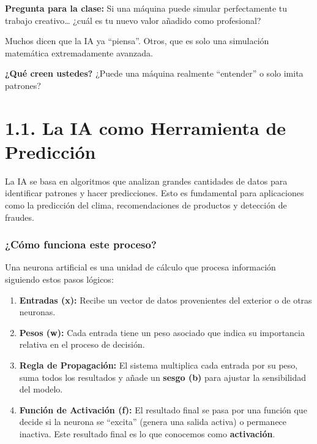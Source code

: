 \documentclass[
  spanish,
  letterpaper,
  DIV=11,
  numbers=noendperiod,
  oneside]{scrreprt}
\providecommand{\tightlist}{%
  \setlength{\itemsep}{0pt}\setlength{\parskip}{0pt}}
\begin{document}
\textbf{Pregunta para la clase:} Si una máquina puede simular
perfectamente tu trabajo creativo\ldots{} ¿cuál es tu nuevo valor
añadido como profesional?

\begin{tcolorbox}[enhanced jigsaw, arc=.35mm, bottomrule=.15mm, bottomtitle=1mm, breakable, colback=white, colbacktitle=quarto-callout-important-color!10!white, colframe=quarto-callout-important-color-frame, coltitle=black, left=2mm, leftrule=.75mm, opacityback=0, opacitybacktitle=0.6, rightrule=.15mm, title=\textcolor{quarto-callout-important-color}{\faExclamation}\hspace{0.5em}{🧠 Gran Debate: ¿La IA piensa o solo calcula?}, titlerule=0mm, toprule=.15mm, toptitle=1mm]

Muchos dicen que la IA ya ``piensa''. Otros, que es solo una simulación
matemática extremadamente avanzada.

\textbf{¿Qué creen ustedes?} ¿Puede una máquina realmente ``entender'' o
solo imita patrones?

\end{tcolorbox}

\section{1.1. La IA como Herramienta de
Predicción}\label{la-ia-como-herramienta-de-predicciuxf3n}

La IA se basa en algoritmos que analizan grandes cantidades de datos
para identificar patrones y hacer predicciones. Esto es fundamental para
aplicaciones como la predicción del clima, recomendaciones de productos
y detección de fraudes.

\subsubsection{¿Cómo funciona este
proceso?}\label{cuxf3mo-funciona-este-proceso}

Una neurona artificial es una unidad de cálculo que procesa información
siguiendo estos pasos lógicos:

\begin{enumerate}
\def\labelenumi{\arabic{enumi}.}
\tightlist
\item
  \textbf{Entradas (x):} Recibe un vector de datos provenientes del
  exterior o de otras neuronas.
\item
  \textbf{Pesos (w):} Cada entrada tiene un peso asociado que indica su
  importancia relativa en el proceso de decisión.
\item
  \textbf{Regla de Propagación:} El sistema multiplica cada entrada por
  su peso, suma todos los resultados y añade un \textbf{sesgo (b)} para
  ajustar la sensibilidad del modelo.
\item
  \textbf{Función de Activación (f):} El resultado final se pasa por una
  función que decide si la neurona se ``excita'' (genera una salida
  activa) o permanece inactiva. Este resultado final es lo que conocemos
  como \textbf{activación}.
\end{enumerate}
\end{document}
